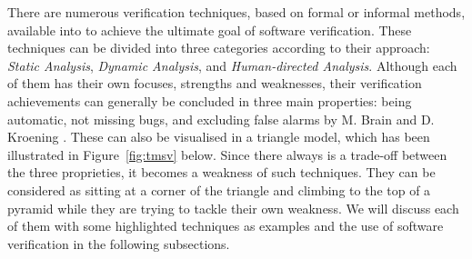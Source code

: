 There are numerous verification techniques, based on formal or informal methods, available into to achieve the ultimate goal of software verification. These techniques can be divided into three categories according to their approach: \textit{Static Analysis}, \textit{Dynamic Analysis}, and \textit{Human-directed Analysis}. Although each of them has their own focuses, strengths and weaknesses, their verification achievements can generally be concluded in three main properties: being automatic, not missing bugs, and excluding false alarms by M. Brain and D. Kroening \cite{TSVP}. These can also be visualised in a triangle model, which has been illustrated in  Figure~\ref{fig:tmsv} below. Since there always is a trade-off between the three proprieties, it becomes a weakness of such techniques. They can be considered as sitting at a corner of the triangle and climbing to the top of a pyramid while they are trying to tackle their own weakness. We will discuss each of them with some  highlighted techniques as examples and the use of software verification in the following subsections.







